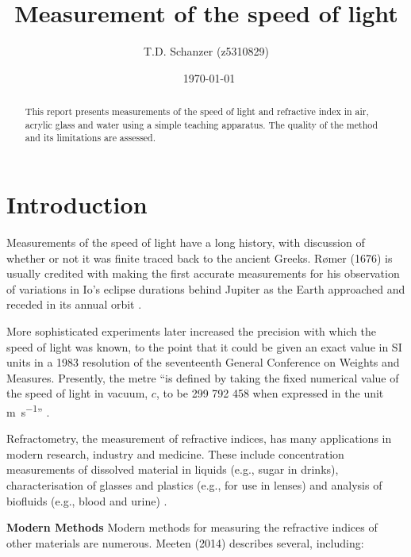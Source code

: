 \documentclass[
    aps,
    prl,
    reprint,
    10pt,
    amsmath,
    amssymb,
    a4paper,
    longbibliography
]{revtex4-2}
\begin{document}
\title{Measurement of the speed of light}
\author{T.D. Schanzer (z5310829)}
\noaffiliation
{}
\noaffiliation
\date{\currenttime~\today}

\begin{abstract}
    This report presents measurements of the speed of light and refractive
    index in air, acrylic glass and water using a simple teaching apparatus.
    The quality of the method and its limitations are assessed.
\end{abstract}

\maketitle

\section{Introduction}

Measurements of the speed of light have a long history, with discussion of
whether or not it was finite traced back to the ancient Greeks.
R{\o}mer (1676) is usually credited with making the first accurate
measurements for his observation of variations in Io's eclipse durations
behind Jupiter as the Earth approached and receded in its annual orbit
\cite{spence_history}.

More sophisticated experiments later increased the precision with which
the speed of light was known, to the point that it could be given an
exact value in SI units in a 1983
resolution of the seventeenth General Conference on Weights and Measures.
Presently, the metre ``is defined by taking
the fixed numerical value of the speed of light in vacuum, $c$, to be
299 792 458 when expressed in the unit \si{\meter \per\second}''
\cite{sibrochure}.

Refractometry, the measurement of refractive indices, has many
applications in modern research, industry and medicine. These include
concentration measurements of dissolved material in liquids (e.g., sugar
in drinks), characterisation of glasses and plastics (e.g., for use in
lenses) and analysis of biofluids (e.g., blood and urine)
\cite{meeten_measurement}.

\textbf{Modern Methods} \newline
Modern methods for measuring the refractive indices of other materials
are numerous. Meeten (2014) \cite{meeten_measurement} describes several,
including:
\end{document}

